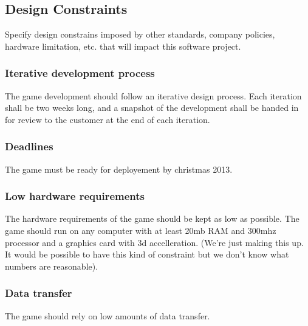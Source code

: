 \subsection{Design Constraints}
Specify design constrains imposed by other standards, company policies, hardware limitation, etc. that will impact this software project.


\subsubsection{Iterative development process}
The game development should follow an iterative design process. Each iteration shall be two weeks long, and a snapshot of the development shall be handed in for review to the customer at the end of each iteration.



\subsubsection{Deadlines}
The game must be ready for deployement by christmas 2013.




\subsubsection{Low hardware requirements}
\label{hwreq}
The hardware requirements of the game should be kept as low as possible. The game should run on any computer with at least 20mb RAM and 300mhz processor and a graphics card with 3d accelleration. (We're just making this up. It would be possible to have this kind of constraint but we don't know what numbers are reasonable).



\subsubsection{Data transfer}
The game should rely on low amounts of data transfer.

